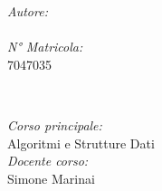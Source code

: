 \begin{titlepage}
\begin{minipage}{0.4\textwidth}
\begin{flushleft} \large
\emph{Autore:}\\
\@author %
\\[1.2em]
\emph{N° Matricola:}\\
7047035 \\[1.2em]
\end{flushleft}
\end{minipage}
~
\begin{minipage}{0.4\textwidth}
\begin{flushright} \large
\emph{Corso principale:} \\
Algoritmi e Strutture Dati  \\[1.2em]
\emph{Docente corso:} \\
Simone Marinai
\end{flushright}
\end{minipage}\\[2cm]
\makeatother


\vfill %

\end{titlepage}
